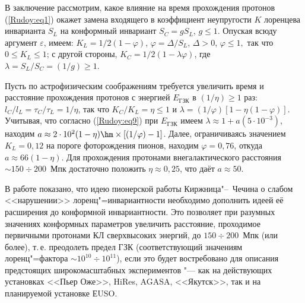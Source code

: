 В заключение рассмотрим, какое влияние на время прохождения протонов (\ref{Rudoy:eq1}) окажет замена входящего в коэффициент
неупругости $K$ лоренцева инварианта $S_L$ на конформный инвариант $S_C=gS_L$, $g\leq1$. Опуская всюду аргумент $\varepsilon$,
имеем: $K_L=1/2(1-\varphi)$, $\varphi=\Delta/S_L$, $\Delta>0$, $\varphi\leq1,$ так что $0\leq K_L\leq1$; с другой стороны,
$K_C=1/2(1-\lambda\varphi)$, где $\lambda=S_L/S_C=(1/g)\geq1$.

Пусть по астрофизическим соображениям требуется увеличить время и расстояние прохождения протонов с энергией $E_{\text{ГЗК}}$ в
$(1/\eta)\geq1$ раз: $l_C/l_L=\tau_C/\tau_L=1/\eta$, так что $K_C/K_L=\eta\leq1$ и $\lambda=(1/\varphi)[1-\eta(1-\varphi)]$.
Учитывая, что согласно (\ref{Rudoy:eq9}) при $E_{\textrm{ГЗК}}$ имеем $\lambda\approx1+a(5\cdot10^{-3})$, находим
$a\approx2\cdot10^2{(1-\eta)} \hm\times  [(1/\varphi)-1]$.
Далее, ограничиваясь значением $K_L=0,12$ на пороге фоторождения пионов, находим $\varphi=0,76$, откуда $a\approx66(1-\eta)$. Для прохождения протонами внегалактического расстояния $\sim150\div200$~Мпк
достаточно положить $\eta\approx0,25$, что даёт $a\approx50$.

\smallskip

 В работе показано, что идею пионерской работы Киржница"--~Чечина \cite{Rudoy:KIRSHNIZ} о слабом
<<нарушении>> лоренц"=инвариантности необходимо дополнить идеей её расширения до конформной инвариантности. Это позволяет при
разумных значениях конформных параметров увеличить расстояние, проходимое первичными протонами КЛ сверхвысоких энергий, до
$150\div200$~Мпк  (или более), т.\,е. преодолеть предел ГЗК (соответствующий значениям лоренц"=фактора $\sim10^{10}\div10^{11}$),
если это будет востребовано для описания предстоящих широкомасштабных экспериментов "--- как на действующих установках <<Пьер
Оже>>, HiRes, AGASA, <<Якутск>>, так и на планируемой установке ЕUSO.

